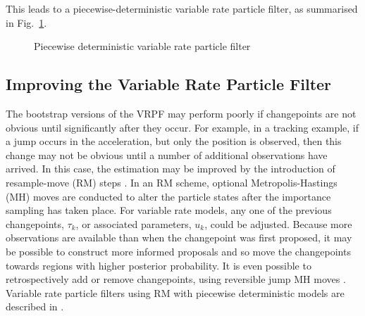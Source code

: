 \documentclass[peerreview,11pt,draftcls,onecolumn]{IEEEtran}
\begin{document}
This leads to a piecewise-deterministic variable rate particle filter, as summarised in Fig.~\ref{alg:VRPF}.

\begin{figure}
\caption{Piecewise deterministic variable rate particle filter}
\label{alg:VRPF}
\end{figure}



\subsection{Improving the Variable Rate Particle Filter}

The bootstrap versions of the VRPF may perform poorly if changepoints are not obvious until significantly after they occur. For example, in a tracking example, if a jump occurs in the acceleration, but only the position is observed, then this change may not be obvious until a number of additional observations have arrived. In this case, the estimation may be improved by the introduction of resample-move (RM) steps \cite{Gilks2001}. In an RM scheme, optional Metropolis-Hastings (MH) moves are conducted to alter the particle states after the importance sampling has taken place. For variable rate models, any one of the previous changepoints, $\tau_k$, or associated parameters, $u_k$, could be adjusted. Because more observations are available than when the changepoint was first proposed, it may be possible to construct more informed proposals and so move the changepoints towards regions with higher posterior probability. It is even possible to retrospectively add or remove changepoints, using reversible jump MH moves \cite{Green1995}. Variable rate particle filters using RM with piecewise deterministic models are described in \cite{Whiteley2011,Gilholm2008}.
\end{document}
